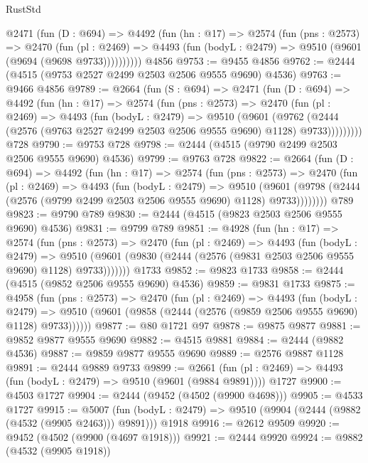 \begin{lexlean}{RustStd}
\begin{coremodule}
      @2471
        (fun (D : @694) =>
        @4492
          (fun (hn : @17) =>
          @2574
            (fun (pns : @2573) =>
            @2470
              (fun (pl : @2469) =>
              @4493 (fun (bodyL : @2479) => @9510 (@9601 (@9694 (@9698 @9733))))))))))
    @4856
@9753 := @9455 @4856
@9762 := @2444 (@4515 (@9753 @2527 @2499 @2503 @2506 @9555 @9690) @4536)
@9763 := @9466 @4856
@9789 := @2664
    (fun (S : @694) =>
    @2471
      (fun (D : @694) =>
      @4492
        (fun (hn : @17) =>
        @2574
          (fun (pns : @2573) =>
          @2470
            (fun (pl : @2469) =>
            @4493
              (fun (bodyL : @2479) =>
              @9510
                (@9601
                  (@9762
                    (@2444 (@2576 (@9763 @2527 @2499 @2503 @2506 @9555 @9690) @1128) @9733)))))))))
    @728
@9790 := @9753 @728
@9798 := @2444 (@4515 (@9790 @2499 @2503 @2506 @9555 @9690) @4536)
@9799 := @9763 @728
@9822 := @2664
    (fun (D : @694) =>
    @4492
      (fun (hn : @17) =>
      @2574
        (fun (pns : @2573) =>
        @2470
          (fun (pl : @2469) =>
          @4493
            (fun (bodyL : @2479) =>
            @9510
              (@9601 (@9798 (@2444 (@2576 (@9799 @2499 @2503 @2506 @9555 @9690) @1128) @9733))))))))
    @789
@9823 := @9790 @789
@9830 := @2444 (@4515 (@9823 @2503 @2506 @9555 @9690) @4536)
@9831 := @9799 @789
@9851 := @4928
    (fun (hn : @17) =>
    @2574
      (fun (pns : @2573) =>
      @2470
        (fun (pl : @2469) =>
        @4493
          (fun (bodyL : @2479) =>
          @9510 (@9601 (@9830 (@2444 (@2576 (@9831 @2503 @2506 @9555 @9690) @1128) @9733)))))))
    @1733
@9852 := @9823 @1733
@9858 := @2444 (@4515 (@9852 @2506 @9555 @9690) @4536)
@9859 := @9831 @1733
@9875 := @4958
    (fun (pns : @2573) =>
    @2470
      (fun (pl : @2469) =>
      @4493
        (fun (bodyL : @2479) =>
        @9510 (@9601 (@9858 (@2444 (@2576 (@9859 @2506 @9555 @9690) @1128) @9733))))))
@9877 := @80 @1721 @97
@9878 := @9875 @9877
@9881 := @9852 @9877 @9555 @9690
@9882 := @4515 @9881
@9884 := @2444 (@9882 @4536)
@9887 := @9859 @9877 @9555 @9690
@9889 := @2576 @9887 @1128
@9891 := @2444 @9889 @9733
@9899 := @2661
    (fun (pl : @2469) => @4493 (fun (bodyL : @2479) => @9510 (@9601 (@9884 @9891))))
    @1727
@9900 := @4503 @1727
@9904 := @2444 (@9452 (@4502 (@9900 @4698)))
@9905 := @4533 @1727
@9915 := @5007
    (fun (bodyL : @2479) => @9510 (@9904 (@2444 (@9882 (@4532 (@9905 @2463))) @9891)))
    @1918
@9916 := @2612 @9509
@9920 := @9452 (@4502 (@9900 (@4697 @1918)))
@9921 := @2444 @9920
@9924 := @9882 (@4532 (@9905 @1918))

\end{coremodule}
\end{lexlean}
